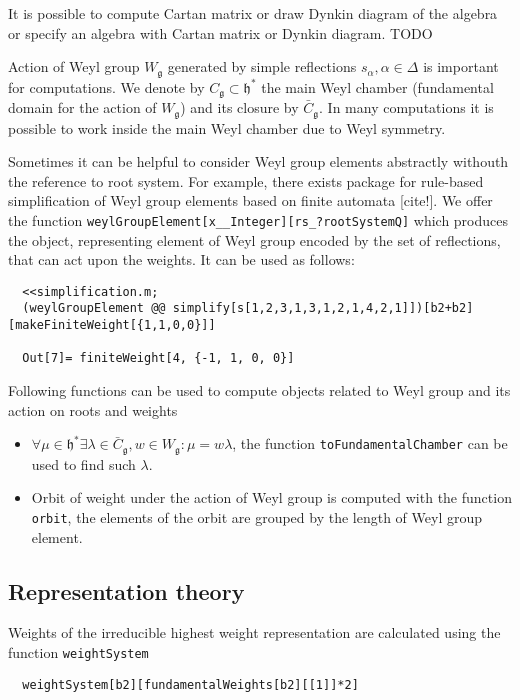\documentclass[12pt]{article}
\theoremstyle{definition}
\newcommand{\gf}{\mathfrak{g}}
\newcommand{\hf}{\mathfrak{h}}
\begin{document}
It is possible to compute Cartan matrix or draw Dynkin diagram of the algebra or specify an algebra with Cartan matrix or Dynkin diagram. TODO

Action of Weyl group $W_{\gf}$ generated by simple reflections $s_{\alpha}, \alpha\in \Delta$ is important for computations. We denote by $C_{\gf}\subset \hf^*$ the main Weyl chamber (fundamental domain for the action of $W_{\gf}$) and its closure by $\bar C_{\gf}$. In many computations it is possible to work inside the main Weyl chamber due to Weyl symmetry. 

Sometimes it can be helpful to consider Weyl group elements abstractly withouth the reference to root system. For example, there exists package for rule-based simplification of Weyl group elements based on finite automata [cite!]. We offer the function \lstinline{weylGroupElement[x__Integer][rs_?rootSystemQ]} which produces the object, representing element of Weyl group encoded by the set of reflections, that can act upon the weights. It can be used as follows:
\begin{lstlisting}
  <<simplification.m;
  (weylGroupElement @@ simplify[s[1,2,3,1,3,1,2,1,4,2,1]])[b2+b2][makeFiniteWeight[{1,1,0,0}]]

  Out[7]= finiteWeight[4, {-1, 1, 0, 0}]
\end{lstlisting}


Following functions can be used to compute objects related to Weyl group and its action on roots and weights
 \begin{itemize}
 \item   $\forall \mu\in \hf^* \exists \lambda\in \bar C_{\gf}, w\in W_{\gf}: \mu=w \lambda$, the function \lstinline{toFundamentalChamber} can be used to find such $\lambda$.
 \item Orbit of weight under the action of Weyl group is computed with the function \lstinline{orbit}, the elements of the orbit are grouped by the length of Weyl group element.
 \end{itemize}

\subsection{Representation theory}
\label{sec:repr-theory}

Weights of the irreducible highest weight representation are calculated using the function \lstinline{weightSystem}
\begin{lstlisting}
  weightSystem[b2][fundamentalWeights[b2][[1]]*2]
\end{lstlisting}
\end{document}
